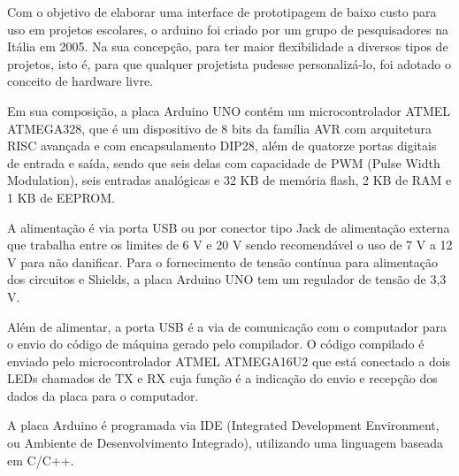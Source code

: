 Com o objetivo de elaborar uma interface de prototipagem de baixo custo para uso em projetos escolares, 
o arduino foi criado por um grupo de pesquisadores na Itália em 2005. Na sua concepção, para ter maior 
flexibilidade a diversos tipos de projetos, isto é, para que qualquer projetista pudesse personalizá-lo, 
foi adotado o conceito de hardware livre.

Em sua composição, a placa Arduino UNO contém um microcontrolador ATMEL ATMEGA328, que é um dispositivo 
de 8 bits da família AVR com arquitetura RISC avançada e com encapsulamento DIP28, além de quatorze portas 
digitais de entrada e saída, sendo que seis delas com capacidade de PWM (Pulse Width Modulation), seis 
entradas analógicas e 32 KB de memória flash, 2 KB de RAM e 1 KB de EEPROM. 

A alimentação é via porta USB ou por conector tipo Jack de alimentação externa que trabalha entre os 
limites de 6 V e 20 V sendo recomendável o uso de 7 V a 12 V para não danificar. Para o fornecimento 
de tensão contínua para alimentação dos circuitos e Shields, a placa Arduino UNO tem um regulador de tensão de 3,3 V.

Além de alimentar, a porta USB é a via de comunicação com o computador para o envio do código de máquina 
gerado pelo compilador. O código compilado é enviado pelo microcontrolador ATMEL ATMEGA16U2 que está 
conectado a dois LEDs chamados de TX e RX cuja função é a indicação do envio e recepção dos dados da 
placa para o computador.

A placa Arduino é programada via IDE (Integrated Development Environment, ou Ambiente de Desenvolvimento 
Integrado), utilizando uma linguagem baseada em C/C++.

    
